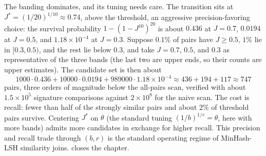 The banding dominates, and its tuning needs care. The transition sits at $J^* =
(1/20)^{1/10} \approx 0.74$, above the threshold, an aggressive precision-favoring
choice: the survival probability $1 - (1 - J^{10})^{20}$ is about $0.436$ at $J =
0.7$, $0.0194$ at $J = 0.5$, and $1.18 \times 10^{-4}$ at $J = 0.3$. Suppose $0.1\%$
of pairs have $J \ge 0.5$, $1\%$ lie in $[0.3, 0.5)$, and the rest lie below $0.3$,
and take $J = 0.7$, $0.5$, and $0.3$ as representative of the three bands (the last
two are upper ends, so their counts are upper estimates). The candidate set is then
about
\[
  1000 \cdot 0.436 + 10000 \cdot 0.0194 + 989000 \cdot 1.18 \times 10^{-4}
  \approx 436 + 194 + 117 \approx 747
\]
pairs, three orders of magnitude below the all-pairs scan, verified with about
$1.5 \times 10^5$ signature comparisons against $2 \times 10^8$ for the naive scan.
The cost is recall: fewer than half of the strongly similar pairs and about $2\%$ of
threshold pairs survive. Centering $J^*$ on $\theta$ (the standard tuning
$(1/b)^{1/r} = \theta$, here with more bands) admits more candidates in exchange for
higher recall. This precision and recall trade through $(b, r)$ is the standard
operating regime of MinHash-LSH similarity joins.  closes the
chapter.
